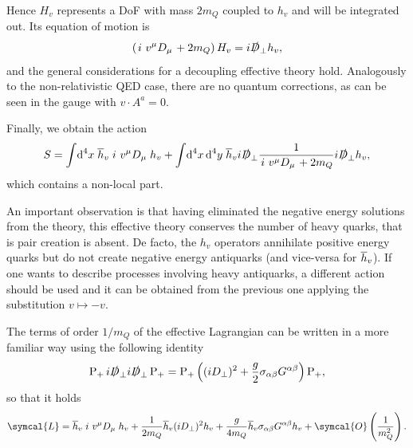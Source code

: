 Hence $H_v$ represents a DoF with mass $2 m_Q$ coupled to $h_v$ and will be integrated out. Its equation of motion is
\begin{equation}
  \left( \left. i \ v^\mu D_\mu \right. + 2 m_Q \right) H_v = i \slashed{D}_\perp h_v ,
\end{equation}
and the general considerations for a decoupling effective theory hold. Analogously to the non-relativistic QED case, there are no quantum corrections, as can be seen in the gauge with $v \cdot A^a = 0$.

Finally, we obtain the action
\begin{equation}
  S = \int \! \D^4 \! x \; \adj{h}_v \left. i \ v^\mu D_\mu \right. h_v + \int \! \D^4 \! x \D^4 \! y \; \adj{h}_v i \slashed{D}_\perp \frac{1}{\left. i \ v^\mu D_\mu \right. + 2 m_Q} i \slashed{D}_\perp h_v ,
\end{equation}
which contains a non-local part.

An important observation is that having eliminated the negative energy solutions from the theory, this effective theory conserves the number of heavy quarks, that is pair creation is absent. De facto, the $h_v$ operators annihilate positive energy quarks but do not create negative energy antiquarks (and vice-versa for $\overline{h}_v$). If one wants to describe processes involving heavy antiquarks, a different action should be used and it can be obtained from the previous one applying the substitution $v \mapsto - v$.

The terms of order $1 / m_Q$ of the effective Lagrangian can be written in a more familiar way using the following identity 
\begin{equation}
  \operatorname{P}_+ i \slashed{D}_\perp i \slashed{D}_\perp \operatorname{P}_+ = \operatorname{P}_+ \left( (i D_\perp)^2 + \frac{g}{2} \sigma_{\alpha \beta} G^{\alpha \beta} \right) \operatorname{P}_+ ,
\end{equation}
so that it holds
\begin{equation}
  \symcal{L} = \adj{h}_v \left. i \ v^\mu D_\mu \right. h_v + \frac{1}{2 m_Q} \adj{h}_v (i D_\perp)^2 h_v + \frac{g}{4 m_Q} \adj{h}_v \sigma_{\alpha \beta} G^{\alpha \beta} h_v + \symcal{O}\left( \frac{1}{m_Q^2} \right) .
  \label{eq:qcd_lagrangian_wo_hdof}
\end{equation}

